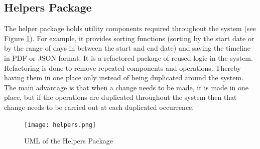 \subsection{Helpers Package}
\par The helper package holds utility components required throughout the system (see Figure \ref{fig:helpers}). For example, it provides sorting functions (sorting by the start date or by the range of days in between the start and end date) and saving the timeline in PDF or JSON format. It is a refactored package of reused logic in the system. Refactoring is done to remove repeated components and operations. Thereby having them in one place only instead of being duplicated around the system. The main advantage is that when a change needs to be made, it is made in one place, but if the operations are duplicated throughout the system then that change needs to be carried out at each duplicated occurrence.
\begin{figure}[H]
\caption{UML of the Helpers Package}
\label{fig:helpers}
\texttt{[image: helpers.png]}
\centering
\end{figure}


